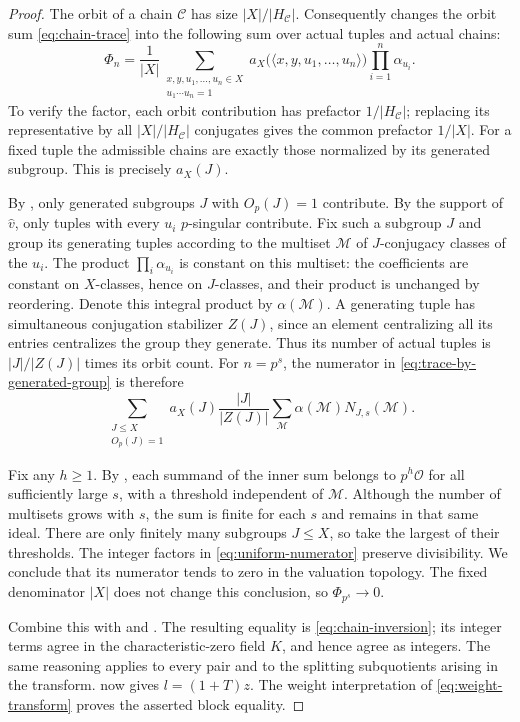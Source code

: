 \begin{proof}
The orbit of a chain $\mathcal C$ has size
$|X|/|H_{\mathcal C}|$. Consequently
 changes the orbit sum
\eqref{eq:chain-trace} into the following sum over actual tuples
and actual chains:
\begin{equation}\label{eq:trace-by-generated-group}
 \Phi_n=\frac1{|X|}
 \sum_{\substack{x,y,u_1,\ldots,u_n\in X\\
                 [x,y]u_1\cdots u_n=1}}
 a_X\bigl(\langle x,y,u_1,\ldots,u_n\rangle\bigr)
 \prod_{i=1}^n\alpha_{u_i}.
\end{equation}
To verify the factor, each orbit contribution has prefactor
$1/|H_{\mathcal C}|$; replacing its representative by all
$|X|/|H_{\mathcal C}|$ conjugates gives the common prefactor
$1/|X|$. For a fixed tuple the admissible chains are exactly those
normalized by its generated subgroup. This is precisely
$a_X(J)$.

By , only generated subgroups
$J$ with $O_p(J)=1$ contribute. By the support of $\widehat v$,
only tuples with every $u_i$ $p$-singular contribute. Fix such a
subgroup $J$ and group its generating tuples according to the
multiset $\mathcal M$ of $J$-conjugacy classes of the $u_i$.
The product $\prod_i\alpha_{u_i}$ is constant on this multiset:
the coefficients are constant on $X$-classes, hence on $J$-classes,
and their product is unchanged by reordering. Denote this integral
product by $\alpha(\mathcal M)$. A generating tuple has simultaneous
conjugation stabilizer $Z(J)$, since an element centralizing all
its entries centralizes the group they generate. Thus its number
of actual tuples is $|J|/|Z(J)|$ times its orbit count. For
$n=p^s$, the numerator in \eqref{eq:trace-by-generated-group}
is therefore
\begin{equation}\label{eq:uniform-numerator}
 \sum_{\substack{J\leq X\\O_p(J)=1}}
 a_X(J)\frac{|J|}{|Z(J)|}
 \sum_{\mathcal M}
   \alpha(\mathcal M)N_{J,s}(\mathcal M).
\end{equation}

Fix any $h\geq1$. By , each summand
of the inner sum belongs to $p^h\mathcal O$ for all sufficiently
large $s$, with a threshold independent of $\mathcal M$. Although
the number of multisets grows with $s$, the sum is finite for each
$s$ and remains in that same ideal. There are only finitely many
subgroups $J\leq X$, so take the largest of their thresholds.
The integer factors in \eqref{eq:uniform-numerator} preserve
divisibility. We conclude that its numerator tends to zero in the
valuation topology. The fixed denominator $|X|$ does not change
this conclusion, so $\Phi_{p^s}\longrightarrow0$.

Combine this with  and
. The resulting equality is
\eqref{eq:chain-inversion}; its integer terms agree in the
characteristic-zero field $K$, and hence agree as integers.
The same reasoning applies to every pair and to the splitting
subquotients arising in the transform. 
now gives $l=(1+T)z$. The weight interpretation of
\eqref{eq:weight-transform} proves the asserted block equality.
\end{proof}
